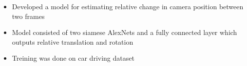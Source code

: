 \documentclass[10pt,a4paper]{source/altacv}
\begin{document}









\begin{itemize}
    \item \small{Developed a model for estimating relative change in camera position between two frames}
    \item \small{Model consisted of two siamese AlexNets and a fully connected layer which outputs relative translation and rotation}
    \item \small{Treining was done on car driving dataset}
    \\
    \smallskip
      
\end{itemize}
    
\end{document}
